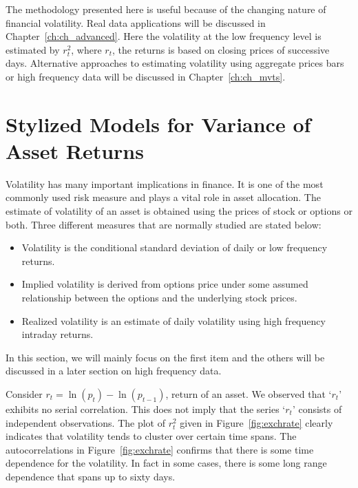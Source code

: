 The methodology presented here is useful because of the changing nature of financial volatility. Real data applications will be discussed in Chapter~\ref{ch:ch_advanced}. Here the volatility at the low frequency level is estimated by $r_t^2$, where $r_t$, the returns is based on closing prices of successive days. Alternative approaches to estimating volatility using aggregate prices bars or high frequency data will be discussed in Chapter~\ref{ch:ch_mvts}. 



\section{Stylized Models for Variance of Asset Returns \label{sec:sty_mod_var}}


Volatility has many important implications in finance. It is one of the most commonly used risk measure and plays a vital role in asset allocation. The estimate of volatility of an asset is obtained using the prices of stock or options or both. Three different measures that are normally studied are stated below:


\begin{itemize}
\item Volatility is the conditional standard deviation of daily or low frequency returns.

\item Implied volatility is derived from options price under some assumed
relationship between the options and the underlying stock prices.

\item Realized volatility is an estimate of daily volatility using high frequency
intraday returns.
\end{itemize}


In this section, we will mainly focus on the first item and the others will be discussed in a later section on high frequency data.


Consider $r_t = \ln{(p_t) - \ln{(p_{t-1})}}$, return of an asset. We observed that `$r_t$' exhibits no serial correlation. This does not imply that the series `$r_t$' consists of independent observations. The plot of $r_t^2$ given in Figure~\ref{fig:exchrate} clearly indicates that volatility tends to cluster over certain time spans. The autocorrelations in Figure~\ref{fig:exchrate} confirms that there is some time dependence for the volatility. In fact in some cases, there is some long range dependence that spans up to sixty days. \\


